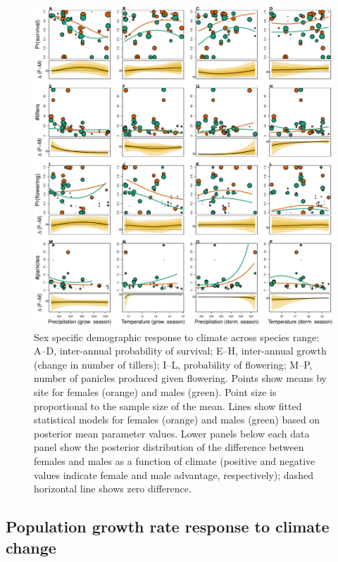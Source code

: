 \documentclass[11pt]{article}\usepackage[]{graphicx}\usepackage[usenames,dvipsnames]{xcolor}
\begin{document}
\begin{figure}%
  \begin{center}
    \includegraphics[width=0.95\linewidth]{Figures/vital_rates.pdf}
  \caption{Sex specific demographic response to climate across species range: A--D, inter-annual probability of survival; E--H, inter-annual growth (change in number of tillers); I--L, probability of flowering; M--P, number of panicles produced given flowering. 
  Points show means by site for females (orange) and males (green). 
  Point size is proportional to the sample size of the mean.
  Lines show fitted statistical models for females (orange) and males (green) based on posterior mean parameter values.
  Lower panels below each data panel show the posterior distribution of the difference between females and males as a function of climate (positive and negative values indicate female and male advantage, respectively); dashed horizontal line shows zero difference.}
  \label{fig:vital_rates}
  \end{center}
\end{figure}

\subsection*{Population growth rate response to climate change}
\end{document}
